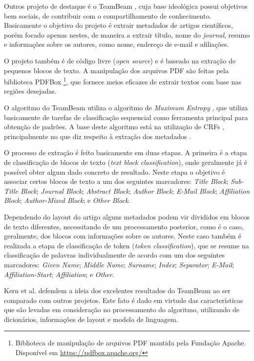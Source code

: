 \documentclass[
	12pt,               %
	openright,          %
	twoside,            %
	a4paper,            %
	english,            %
	brazil              %
	]{abntex2}
\begin{document}
Outros projeto de destaque é o TeamBeam \cite{teambeam}, cuja base ideológica possui objetivos bem sociais, de contribuir com o compartilhamento de conhecimento. Basicamente o objetivo do projeto é extrair metadados de artigos científicos, porém focado apenas nestes, de maneira a extrair título, nome do \textit{journal}, resumo e informações sobre os autores, como nome, endereço de e-mail e afiliações.

O projeto também é de código livre (\textit{open source}) e é baseado na extração de pequenos blocos de texto. A manipulação dos arquivos PDF são feitas pela biblioteca PDFBox \footnote{Biblioteca de manipulação de arquivos PDF mantida pela Fundação Apache. Disponível em \url{https://pdfbox.apache.org/}}, que fornece meios eficazes de extrair textos com base nas regiões desejadas.

O algoritmo do TeamBeam utiliza o algoritmo de \textit{Maximum Entropy} \cite{maximum-entropy}, que utiliza basicamente de tarefas de classificação sequencial como ferramenta principal para obtenção de padrões. A base deste algoritmo está na utilização de CRFs \cite{crf}, principalmente no que diz respeito à extração dos metadados \cite{crf-ie}.

O processo de extração é feito basicamente em duas etapas. A primeira é a etapa de classificação de blocos de texto (\textit{text block classification}), onde geralmente já é possível obter algum dado concreto de resultado. Neste etapa o objetivo é associar certos blocos de texto a um dos seguintes marcadores: \textit{Title Block}; \textit{Sub-Title Block}; \textit{Journal Block}; \textit{Abstract Block}; \textit{Author Block}; \textit{E-Mail Block}; \textit{Affiliation Block}; \textit{Author-Mixed Block}; e \textit{Other Block}.

Dependendo do layout do artigo alguns metadados podem vir divididos em blocos de texto diferentes, necessitando de um processamento posterior, como é o caso, geralmente, dos blocos com informações sobre os autores. Neste caso também é realizada a etapa de classificação de token (\textit{token classification}), que se resume na classificação de palavras individualmente de acordo com um dos seguintes marcadores: \textit{Given Name}; \textit{Middle Name}; \textit{Surname}; \textit{Index}; \textit{Separator}; \textit{E-Mail}; \textit{Affiliation-Start}; \textit{Affiliation}; e \textit{Other}.

Kern et al. defendem a ideia dos excelentes resultados do TeamBeam ao ser comparado com outros projetos. Este fato é dado em virtude das características que são levadas em consideração no processamento do algoritmo, utilizando de dicionários, informações de layout e modelo de linguagem.
\end{document}
